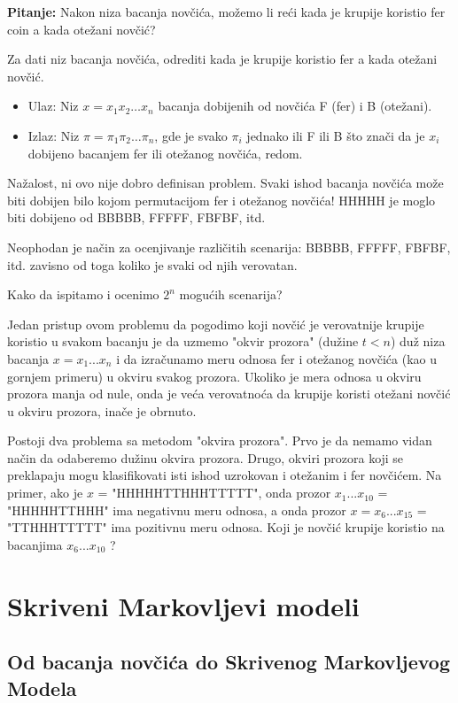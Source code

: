 \textbf{Pitanje:} Nakon niza bacanja novčića, možemo
li reći kada je krupije koristio fer coin a
kada otežani novčić?

\begin{problem}
Za dati niz bacanja novčića,
odrediti kada je krupije koristio fer a kada
otežani novčić.
\begin{itemize}
\item Ulaz: Niz $ x = x_1 x_2 \ldots x_n $ bacanja dobijenih
od novčića F (fer) i B (otežani).
\item Izlaz: Niz $ \pi = \pi_1 \pi_2 \ldots \pi_n $, gde je svako $ \pi_i $
jednako ili F ili B što znači da je $ x_i $
dobijeno bacanjem fer ili otežanog novčića,
redom.
\end{itemize}
\end{problem}

Nažalost, ni ovo nije dobro definisan problem. Svaki ishod bacanja novčića može biti dobijen bilo kojom permutacijom fer i
otežanog novčića! HHHHH je moglo biti dobijeno od BBBBB,
FFFFF, FBFBF, itd.

Neophodan je način za ocenjivanje različitih scenarija: BBBBB, FFFFF,
FBFBF, itd. zavisno od toga koliko je svaki od njih verovatan.

Kako da ispitamo i ocenimo $ 2^n $ mogućih scenarija? 

Jedan pristup ovom problemu da pogodimo koji novčić je verovatnije krupije koristio u svakom bacanju je da uzmemo "okvir prozora" (dužine $ t < n $) duž niza bacanja $ x = x_1...x_n $ i da izračunamo meru odnosa fer i otežanog novčića (kao u gornjem primeru) u okviru svakog prozora. Ukoliko je mera odnosa u okviru prozora manja od nule, onda je veća verovatnoća da krupije koristi otežani novčić u okviru prozora, inače je obrnuto.

Postoji dva problema sa metodom "okvira prozora". Prvo je da nemamo vidan način da odaberemo dužinu okvira prozora. Drugo, okviri prozora koji se preklapaju mogu klasifikovati isti ishod uzrokovan i otežanim i fer novčićem. Na primer, ako je $x$ = "HHHHHTTHHHTTTTT", onda prozor $x_1...x_{10}$ = "HHHHHTTHHH" ima negativnu meru odnosa, a onda prozor $ x = x_6...x_{15}$ = "TTHHHTTTTT" ima pozitivnu meru odnosa. Koji je novčić krupije koristio na bacanjima $x_6...x_{10}$ ?

\section{Skriveni Markovljevi modeli}
\subsection{Od bacanja novčića do Skrivenog Markovljevog Modela}

